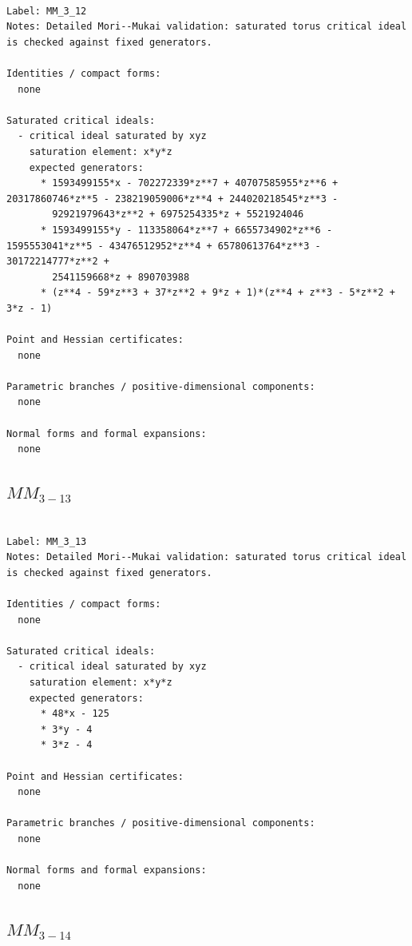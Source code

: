 \documentclass[10pt,a4paper]{article}
\begin{document}
\begin{lstlisting}

Label: MM_3_12
Notes: Detailed Mori--Mukai validation: saturated torus critical ideal is checked against fixed generators.

Identities / compact forms:
  none

Saturated critical ideals:
  - critical ideal saturated by xyz
    saturation element: x*y*z
    expected generators:
      * 1593499155*x - 702272339*z**7 + 40707585955*z**6 + 20317860746*z**5 - 238219059006*z**4 + 244020218545*z**3 -
        92921979643*z**2 + 6975254335*z + 5521924046
      * 1593499155*y - 113358064*z**7 + 6655734902*z**6 - 1595553041*z**5 - 43476512952*z**4 + 65780613764*z**3 - 30172214777*z**2 +
        2541159668*z + 890703988
      * (z**4 - 59*z**3 + 37*z**2 + 9*z + 1)*(z**4 + z**3 - 5*z**2 + 3*z - 1)

Point and Hessian certificates:
  none

Parametric branches / positive-dimensional components:
  none

Normal forms and formal expansions:
  none

\end{lstlisting}

\subsection*{$ MM_{3-13} $}

\begin{lstlisting}

Label: MM_3_13
Notes: Detailed Mori--Mukai validation: saturated torus critical ideal is checked against fixed generators.

Identities / compact forms:
  none

Saturated critical ideals:
  - critical ideal saturated by xyz
    saturation element: x*y*z
    expected generators:
      * 48*x - 125
      * 3*y - 4
      * 3*z - 4

Point and Hessian certificates:
  none

Parametric branches / positive-dimensional components:
  none

Normal forms and formal expansions:
  none

\end{lstlisting}

\subsection*{$ MM_{3-14} $}
\end{document}
